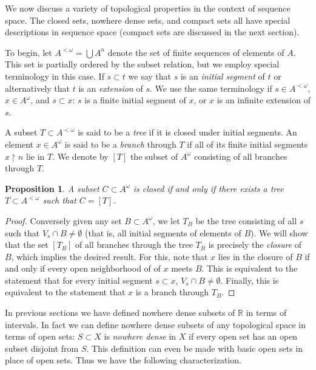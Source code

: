 \documentclass[11pt,oneside]{amsbook}
\newcommand{\R}{\mathbb R}
\theoremstyle{definition}
\theoremstyle{plain}
\newtheorem{proposition}[theorem]{Proposition}
\theoremstyle{definition}
\theoremstyle{remark}
\numberwithin{equation}{section}
\numberwithin{figure}{section}
\begin{document}
We now discuss a variety of topological properties in the context of sequence space. The closed sets, nowhere dense sets, and compact sets all have special descriptions in sequence space (compact sets are discussed in the next section).

To begin, let $A^{<\omega}=\bigcup A^n$ denote the set of finite sequences of elements of $A$. This set is partially ordered by the subset relation, but we employ special terminology in this case. If $s\subset t$ we say that $s$ is an \emph{initial segment} of $t$ or alternatively that $t$ is an \emph{extension} of $s$. We use the same terminology if $s\in A^{<\omega}$, $x\in A^\omega$, and $s\subset x$: $s$ is a finite initial segment of $x$, or $x$ is an infinite extension of $s$.

A subset $T\subset A^{<\omega}$ is said to be a \emph{tree} if it is closed under initial segments. An element $x\in A^\omega$ is said to be a \emph{branch} through $T$ if all of its finite initial segments $x\restriction n$ lie in $T$. We denote by $[T]$ the subset of $A^\omega$ consisting of all branches through $T$.

\begin{proposition}
  A subset $C\subset A^\omega$ is closed if and only if there exists a tree $T\subset A^{<\omega}$ such that $C=[T]$.
\end{proposition}

\begin{proof}
  Conversely given any set $B\subset A^\omega$, we let $T_B$ be the tree consisting of all $s$ such that $V_s\cap B\neq\emptyset$ (that is, all initial segments of elements of $B$). We will show that the set $[T_B]$ of all branches through the tree $T_B$ is precisely the \emph{closure} of $B$, which implies the desired result. For this, note that $x$ lies in the closure of $B$ if and only if every open neighborhood of of $x$ meets $B$. This is equivalent to the statement that for every initial segment $s\subset x$, $V_s\cap B\neq\emptyset$. Finally, this is equivalent to the statement that $x$ is a branch through $T_B$.
\end{proof}


In previous sections we have defined nowhere dense subsets of $\R$ in terms of intervals. In fact we can define nowhere dense subsets of any topological space in terms of open sets: $S\subset X$ is \emph{nowhere dense} in $X$ if every open set has an open subset disjoint from $S$. This definition can even be made with basic open sets in place of open sets. Thus we have the following characterization.
\end{document}
